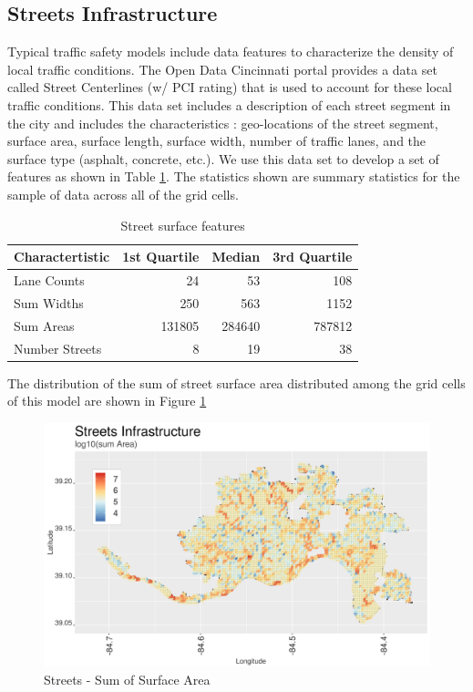\documentclass{llncs}
\begin{document}
\subsection{Streets Infrastructure}

Typical traffic safety models include data features to characterize the density of local traffic conditions. The Open Data Cincinnati portal provides a data set called Street Centerlines (w/ PCI rating) that is used to account for these local traffic conditions. This data set includes a description of each street segment in the city and includes the characteristics : geo-locations of the street segment, surface area, surface length, surface width, number of traffic lanes, and the surface type (asphalt, concrete, etc.). We use this data set to develop a set of features as shown in Table \ref{table : streetFeatures}. The statistics shown are summary statistics for the sample of data across all of the grid cells.

\FloatBarrier
\begin{table}[!h]
\begin{center}
\caption{Street surface features}
\label{table : streetFeatures}
\begin{tabular}{lrrr}
\hline
\rule{0pt}{12pt}
Charactertistic	&	1st Quartile	&	Median	&	3rd Quartile	\\[2pt]
\hline
Lane Counts	&	24	&	53	&	108	\\
Sum Widths	&	250	&	563	&	1152	\\
Sum Areas	&	131805	&	284640	&	787812	\\
Number Streets	&	8	&	19	&	38	\\[2pt]
\hline
\end{tabular}
\end{center}
\end{table}
\FloatBarrier
%


The distribution of the sum of street surface area distributed among the grid cells of this model are shown in Figure \ref{figure : streetsSumArea}

\FloatBarrier
\begin{figure}
 	\includegraphics[width=\textwidth, height=\textheight, keepaspectratio]{streetsSumArea}
 	\caption{Streets - Sum of Surface Area}
	\label{figure : streetsSumArea}
\end{figure}
\FloatBarrier
\end{document}
